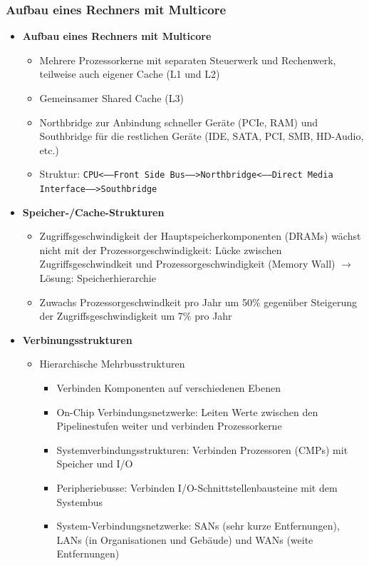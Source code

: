 \subsubsection{Aufbau eines Rechners mit Multicore}
\begin{itemize}
	\item \textbf{Aufbau eines Rechners mit Multicore}
	\begin{itemize}
		\item Mehrere Prozessorkerne mit separaten Steuerwerk und Rechenwerk, teilweise auch eigener Cache (L1 und L2)
		\item Gemeinsamer Shared Cache (L3)
		\item Northbridge zur Anbindung schneller Geräte (PCIe, RAM) und Southbridge für die restlichen Geräte (IDE, SATA, PCI, SMB, HD-Audio, etc.)
		\item Struktur: \texttt{CPU<-----Front Side Bus----->Northbridge<-----Direct Media Interface----->Southbridge}
	\end{itemize}
	\item \textbf{Speicher-/Cache-Strukturen}
	\begin{itemize}
		\item Zugriffsgeschwindigkeit der Hauptspeicherkomponenten (DRAMs) wächst nicht mit der Prozessorgeschwindigkeit: Lücke zwischen Zugriffsgeschwindkeit und Prozessorgeschwindigkeit (Memory Wall) \(\rightarrow\) Lösung: Speicherhierarchie
		\item Zuwachs Prozessorgeschwindkeit pro Jahr um 50\% gegenüber Steigerung der Zugriffsgeschwindigkeit um 7\% pro Jahr
	\end{itemize}
	\item \textbf{Verbinungsstrukturen}
	\begin{itemize}
		\item Hierarchische Mehrbusstrukturen
		\begin{itemize}
			\item Verbinden Komponenten auf verschiedenen Ebenen
			\item On-Chip Verbindungsnetzwerke: Leiten Werte zwischen den Pipelinestufen weiter und verbinden Prozessorkerne
			\item Systemverbindungsstrukturen: Verbinden Prozessoren (CMPs) mit Speicher und I/O
			\item Peripheriebusse: Verbinden I/O-Schnittstellenbausteine mit dem Systembus
			\item System-Verbindungsnetzwerke: SANs (sehr kurze Entfernungen), LANs (in Organisationen und Gebäude) und WANs (weite Entfernungen)

\end{itemize}
\end{itemize}
\end{itemize}
